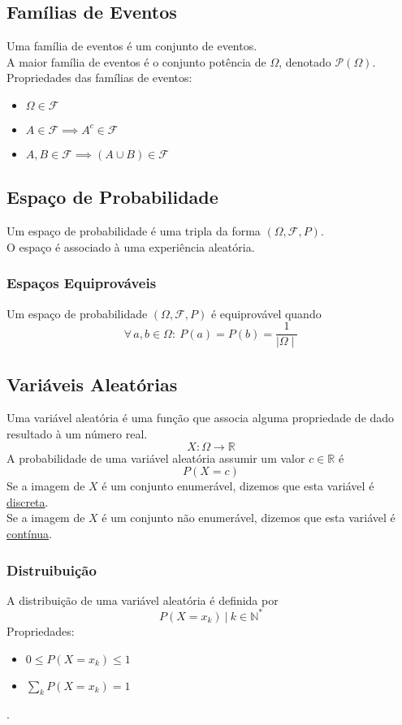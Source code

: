 \documentclass{article}
\begin{document}
\subsection{Famílias de Eventos}
Uma família de eventos é um conjunto de eventos. \\
A maior família de eventos é o conjunto potência de $\Omega$, denotado $\mathcal{P}(\Omega)$. \\[5pt]
Propriedades das famílias de eventos:
\begin{itemize}
  \item $\Omega \in \mathcal{F}$
  \item $A \in \mathcal{F} \implies A^c \in \mathcal{F}$
  \item $A, B \in \mathcal{F} \implies (A \cup B) \in \mathcal{F}$
\end{itemize}


\subsection{Espaço de Probabilidade}
Um espaço de probabilidade é uma tripla da forma $(\Omega, \mathcal{F}, P)$. \\
O espaço é associado à uma experiência aleatória.

\subsubsection{Espaços Equiprováveis}
Um espaço de probabilidade $(\Omega, \mathcal{F}, P)$ é equiprovável quando
\[ \forall \, a, b \in \Omega: \> P({a}) = P({b}) = \frac{1}{\mid \Omega \mid} \]


\subsection{Variáveis Aleatórias}
Uma variável aleatória é uma função que associa alguma propriedade de dado resultado à um número real.
\[ X: \Omega \to \mathbb{R} \]
A probabilidade de uma variável aleatória assumir um valor $c \in \mathbb{R}$ é
\[ P(X = c) \]
Se a imagem de $X$ é um conjunto enumerável, dizemos que esta variável é \uline{discreta}. \\[5pt]
Se a imagem de $X$ é um conjunto não enumerável, dizemos que esta variável é \uline{contínua}. \\[5pt]

\subsubsection{Distruibuição}
A distribuição de uma variável aleatória é definida por
\[ P(X = x_k) \:\big|\: k \in \mathbb{N}^* \]
Propriedades:
\begin{itemize}
  \item $0 \leq P(X = x_k) \leq 1$
  \item $\sum\limits_k P(X = x_k) = 1$
\end{itemize}
.
\end{document}
